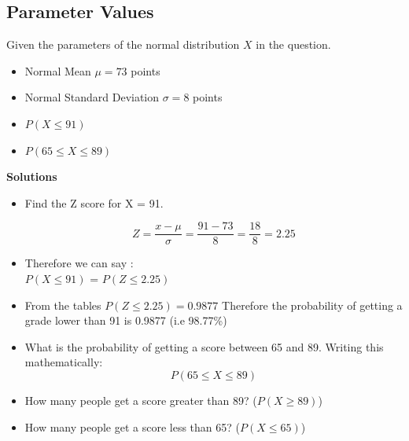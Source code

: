 \documentclass[]{report}
\begin{document}
	
	
	

	
	
	
	
	
	
	
	
	
	
	
	
	
	
	
	
	



\subsection*{Parameter Values}

Given the parameters of the normal distribution $X$ in the question.
\begin{itemize}
	\item Normal Mean $\mu = 73$ points
	\item Normal Standard Deviation $\sigma = 8$ points
\end{itemize}

\begin{itemize}
	\item $P(X \leq 91)$
	\item $P(65 \leq X \leq 89)$
\end{itemize}

\noindent \textbf{Solutions}
\begin{itemize}
	\item Find the Z score for X = 91.
	
	\[ Z = \frac{x- \mu}{ \sigma} = \frac{91 - 73}{8} =\frac{18}{8} = 2.25\]
	\item Therefore we can say :\\ $P(X \leq 91)$ = $P(Z \leq 2.25)$ \\
	
	
\item From the tables $P(Z \leq 2.25) = 0.9877$
Therefore the probability of getting a grade lower than 91 is 0.9877 (i.e 98.77\%)


\item What is the probability of getting a score between 65 and 89.
Writing this mathematically:
\[ P(65 \leq X \leq 89) \]
\end{itemize}




\begin{itemize}
\item How many people get a score greater than 89? ($P(X\geq 89)$)
\item How many people get a score less than 65? ($P(X\leq 65)$)
\end{itemize}
\end{document}
